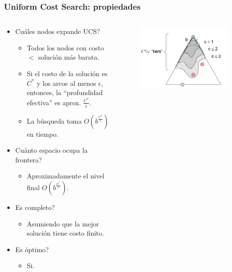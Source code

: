 \documentclass[10pt]{beamer}
\begin{document}
\begin{frame}
  \frametitle{Uniform Cost Search: propiedades}
  \begin{columns}
    \begin{column}{0.6\textwidth}
      \begin{itemize}
        \item Cuáles nodos expande UCS?
          \begin{itemize}
            \item Todos los nodos con costo $<$ solución más barata.
            \item Si el costo de la solución es $C^*$ y los arcos al menos $\epsilon$, entonces,
            la ``profundidad efectiva'' es aprox. $\frac{C^*}{\epsilon}$.
            \item La búsqueda toma $O(b^{\frac{C^*}{\epsilon}})$ en tiempo.
          \end{itemize}
        \item Cuánto espacio ocupa la frontera?
          \begin{itemize}
            \item Aproximadamente el nivel final $O(b^{\frac{C^*}{\epsilon}})$.
          \end{itemize}
        \item Es completo?
          \begin{itemize}
            \item Asumiendo que la mejor solución tiene costo finito.
          \end{itemize}
        \item Es óptimo?
          \begin{itemize}
            \item Si.
          \end{itemize}
      \end{itemize}
    \end{column}
    \begin{column}{0.4\textwidth}
      \begin{figure}[!h] 
        \centering
        \includegraphics[width=1\textwidth]{img/ucs2}
      \end{figure} 
    \end{column}
  \end{columns}
\end{frame}
\end{document}
